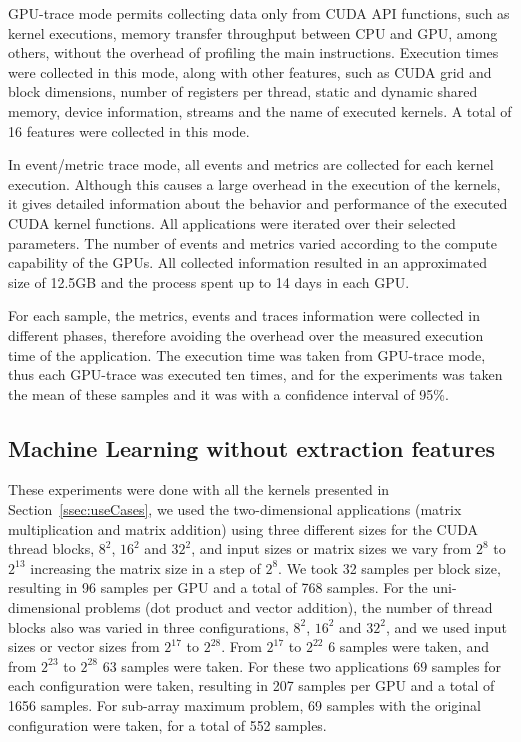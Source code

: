 GPU-trace mode permits collecting data only from CUDA API functions, such as kernel executions, memory transfer throughput between CPU and GPU, among others, without the overhead of profiling the main instructions. Execution times were collected in this mode, along with other features, such as CUDA grid and block dimensions, number of registers per thread, static and dynamic shared memory, device information, streams and the name of executed kernels. A total of 16 features were collected in this mode. 

In event/metric trace mode, all events and metrics are collected for each kernel execution. Although this causes a large overhead in the execution of the kernels, it gives detailed information about the behavior and performance of the executed CUDA kernel functions. All applications were iterated over their selected parameters. The number of events and metrics varied according to the compute capability of the GPUs. All collected information resulted in an approximated size of 12.5GB and the process spent up to 14 days in each GPU. 

For each sample, the metrics, events and traces information were collected in different phases, therefore avoiding the overhead over the measured execution time of the application. The execution time was taken from GPU-trace mode, thus each GPU-trace was executed ten times, and for the experiments was taken the mean of these samples and it was with a confidence interval of 95\%. 


\subsection{Machine Learning without extraction features}\label{ssec:methodFair}
These experiments were done with all the kernels presented in Section~\ref{ssec:useCases}, we used the two-dimensional applications (matrix multiplication and matrix addition) using three different sizes for the CUDA thread blocks, $8^2$, $16^2$ and $32^2$, and input sizes or matrix sizes we vary from $2^{8}$ to $2^{13}$ increasing the matrix size in a step of $2^8$. We took 32 samples per block size, resulting in 96 samples per GPU and a total of 768 samples. For the uni-dimensional problems (dot product and vector addition), the number of thread blocks also was varied in three configurations, $8^2$, $16^2$ and $32^2$, and we used input sizes or vector sizes from $2^{17}$ to $2^{28}$. From $2^{17}$ to $2^{22}$ 6 samples were taken, and from $2^{23}$ to $2^{28}$ 63 samples were taken. For these two applications 69 samples for each configuration were taken, resulting in 207 samples per GPU and a total of 1656 samples. For sub-array maximum problem, 69 samples with the original configuration were taken, for a total of 552 samples. 

